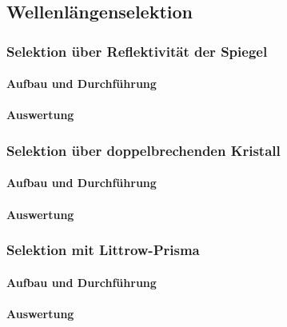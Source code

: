 \subsection{Wellenlängenselektion}

\subsubsection{Selektion über Reflektivität der Spiegel}

\paragraph{Aufbau und Durchführung}

\paragraph{Auswertung}


\subsubsection{Selektion über doppelbrechenden Kristall}


\paragraph{Aufbau und Durchführung}

\paragraph{Auswertung}

\subsubsection{Selektion mit Littrow-Prisma}


\paragraph{Aufbau und Durchführung}

\paragraph{Auswertung}

